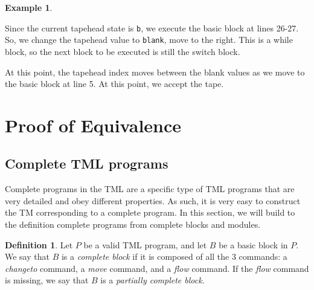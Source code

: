\documentclass{article}
\theoremstyle{definition}
\newtheorem{definition}[rules]{Definition}
\newtheorem{example}[rules]{Example}
\theoremstyle{plain}
\begin{document}
\begin{example}
\begin{figure}[H]
    \end{figure}
    \noindent Since the current tapehead state is \texttt{b}, we execute the basic block at lines 26-27. So, we change the tapehead value to \texttt{blank}, move to the right. This is a while block, so the next block to be executed is still the switch block.
    \begin{figure}[H]
        \centering
    \end{figure}
    \noindent At this point, the tapehead index moves between the blank values as we move to the basic block at line 5. At this point, we accept the tape.
\end{example}
\newpage

\section{Proof of Equivalence}
\subsection{Complete TML programs}
\noindent Complete programs in the TML are a specific type of TML programs that are very detailed and obey different properties. As such, it is very easy to construct the TM corresponding to a complete program. In this section, we will build to the definition complete programs from complete blocks and modules.
\begin{definition}
    Let $P$ be a valid TML program, and let $B$ be a basic block in $P$. We say that $B$ is a \emph{complete block} if it is composed of all the 3 commands: a \textit{changeto} command, a \textit{move} command, and a \textit{flow} command. If the \textit{flow} command is missing, we say that $B$ is a \emph{partially complete block}.
\end{definition}
\end{document}
